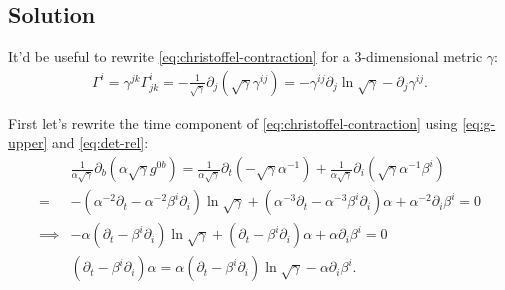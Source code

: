 \documentclass[aps,prd,preprint]{revtex4-1}
\begin{document}
\subsection{Solution}

It'd be useful to rewrite \eqref{eq:christoffel-contraction} for a
3-dimensional metric $\gamma$:
\begin{align} \label{eq:3d-christoffel}
  \Gamma^i = \gamma^{jk} \Gamma^i_{jk} =
    -\frac{1}{\sqrt{\gamma}} \partial_j \left(
      \sqrt{\gamma} \gamma^{ij} \right) =
    - \gamma^{ij} \partial_j \ln \sqrt{\gamma} - \partial_j \gamma^{ij}.
\end{align}

First let's rewrite the time component of
\eqref{eq:christoffel-contraction} using \eqref{eq:g-upper} and
\eqref{eq:det-rel}:
\begin{align}
  & \frac{1}{\alpha \sqrt{\gamma}} \partial_b (
    \alpha \sqrt{\gamma} g^{0b} ) =
  \frac{1}{\alpha \sqrt{\gamma}} \partial_t (
    -\sqrt{\gamma} \alpha^{-1} )
  + \frac{1}{\alpha \sqrt{\gamma}} \partial_i (
    \sqrt{\gamma} \alpha^{-1} \beta^i ) \\
  = &
    - \left(
      \alpha^{-2} \partial_t
      - \alpha^{-2} \beta^i \partial_i \right) \ln \sqrt{\gamma}
    + \left( \alpha^{-3} \partial_t
      - \alpha^{-3} \beta^i \partial_i \right) \alpha
    + \alpha^{-2} \partial_i \beta^i = 0 \\
  \implies &
    - \alpha \left(
      \partial_t
      - \beta^i \partial_i \right) \ln \sqrt{\gamma}
    + \left( \partial_t
      - \beta^i \partial_i \right) \alpha
    + \alpha \partial_i \beta^i = 0 \label{eq:time-pre-1} \\
  &
    \left( \partial_t - \beta^i \partial_i \right) \alpha =
    \alpha \left(
      \partial_t
      - \beta^i \partial_i \right) \ln \sqrt{\gamma}
    - \alpha \partial_i \beta^i \label{eq:time-1}.
\end{align}
\end{document}
